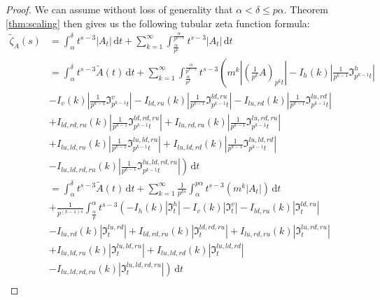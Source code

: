 \documentclass{article}
\theoremstyle{plain}
\numberwithin{equation}{section}
\numberwithin{table}{section}
\numberwithin{figure}{section}
\begin{document}
\begin{proof}
We can assume without loss of generality that $\alpha < \delta \leq p\alpha$. Theorem \ref{thm:scaling} then gives us the following tubular zeta function formula:
\begin{align}
\tilde{\zeta}_A(s)
&= \int_{\alpha}^{\delta} t^{s-3} |A_t| \,\mathrm{d}t + \sum_{k=1}^{\infty} \int_{\frac{\alpha}{p^k}}^{\frac{\alpha}{p^{k-1}}} t^{s-3} |A_t| \,\mathrm{d}t \nonumber\\
&= \int_{\alpha}^{\delta} t^{s-3} \tilde{A}(t) \,\mathrm{d}t + \sum_{k=1}^{\infty} \int_{\frac{\alpha}{p^k}}^{\frac{\alpha}{p^{k-1}}} t^{s-3} \left(m^k \left|\left(\frac{1}{p^k} A\right)_{p^k t}\right| - I_{h}(k) \left|\frac{1}{p^{k-1}} \mathfrak{I}_{p^{k-1} t}^{h}\right|\right.\nonumber\\&\left. - I_{v}(k) \left|\frac{1}{p^{k-1}} \mathfrak{I}_{p^{k-1} t}^{v}\right| - I_{ld,ru}(k) \left|\frac{1}{p^{k-1}} \mathfrak{I}_{p^{k-1} t}^{ld,ru}\right| - I_{lu,rd}(k) \left|\frac{1}{p^{k-1}} \mathfrak{I}_{p^{k-1} t}^{lu,rd}\right|\right.\nonumber\\&\left. + I_{ld,rd,ru}(k) \left|\frac{1}{p^{k-1}} \mathfrak{I}_{p^{k-1} t}^{ld,rd,ru}\right| + I_{lu,rd,ru}(k) \left|\frac{1}{p^{k-1}} \mathfrak{I}_{p^{k-1} t}^{lu,rd,ru}\right|\right.\nonumber\\&\left. + I_{lu,ld,ru}(k) \left|\frac{1}{p^{k-1}} \mathfrak{I}_{p^{k-1} t}^{lu,ld,ru}\right| + I_{lu,ld,rd}(k) \left|\frac{1}{p^{k-1}} \mathfrak{I}_{p^{k-1} t}^{lu,ld,rd}\right|\right.\nonumber\\&\left. - I_{lu,ld,rd,ru}(k) \left|\frac{1}{p^{k-1}} \mathfrak{I}_{p^{k-1} t}^{lu,ld,rd,ru}\right|\right) \,\mathrm{d}t\\
&= \int_{\alpha}^{\delta} t^{s-3} \tilde{A}(t) \,\mathrm{d}t + \sum_{k=1}^{\infty} \frac{1}{p^{ks}} \int_{\alpha}^{p\alpha} t^{s-3} \left(m^k |A_t|\right) \,\mathrm{d}t\nonumber\\&
+ \frac{1}{p^{(k-1)s}} \int_{\frac{\alpha}{p}}^{\alpha} t^{s-3} \left( - I_{h}(k) \left|\mathfrak{I}_t^{h}\right| - I_{v}(k) \left|\mathfrak{I}_t^{v}\right| - I_{ld,ru}(k) \left|\mathfrak{I}_t^{ld,ru}\right|\right.\nonumber\\&\left. - I_{lu,rd}(k) \left|\mathfrak{I}_t^{lu,rd}\right| + I_{ld,rd,ru}(k) \left|\mathfrak{I}_t^{ld,rd,ru}\right| + I_{lu,rd,ru}(k) \left|\mathfrak{I}_t^{lu,rd,ru}\right|\right.\nonumber\\&\left. + I_{lu,ld,ru}(k) \left|\mathfrak{I}_t^{lu,ld,ru}\right| + I_{lu,ld,rd}(k) \left|\mathfrak{I}_t^{lu,ld,rd}\right|\right.\nonumber\\&\left. - I_{lu,ld,rd,ru}(k) \left|\mathfrak{I}_t^{lu,ld,rd,ru}\right|\right) \,\mathrm{d}t\\

\end{align}
\end{proof}
\end{document}

